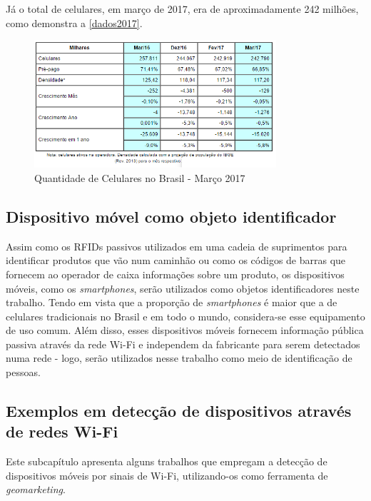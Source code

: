 Já o total de celulares, em março de 2017, era de aproximadamente 242 milhões, como demonstra a \autoref{dados2017}.

\begin{figure}[!h]
  \caption{\label{dados2017}Quantidade de Celulares no Brasil - Março 2017}
  \begin{center}
    \includegraphics[width=0.8\textwidth]{img/dados2017.png}
  \end{center}
\end{figure}

\subsection{Dispositivo móvel como objeto identificador}
\label{dispositivo-coisa}
Assim como os RFIDs passivos utilizados em uma cadeia de suprimentos para identificar produtos que vão num caminhão ou como os códigos de barras
que fornecem ao operador de caixa informações sobre um produto, os dispositivos móveis, como os \emph{smartphones}, serão utilizados
como objetos identificadores neste trabalho. Tendo em vista que a proporção de \emph{smartphones} é maior que a de celulares tradicionais no Brasil e em
todo o mundo, considera-se esse equipamento de uso comum. Além disso, esses dispositivos móveis fornecem informação pública passiva
através da rede Wi-Fi e independem da fabricante para serem detectados numa rede - logo, serão utilizados nesse trabalho como meio de identificação de pessoas.

\subsection{Exemplos em detecção de dispositivos através de redes Wi-Fi}
\label{trabalhos-correlatos}
Este subcapítulo apresenta alguns trabalhos que empregam a detecção de dispositivos móveis por sinais de Wi-Fi, utilizando-os como ferramenta de \emph{geomarketing}.


